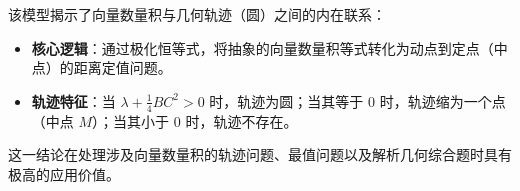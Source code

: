 \begin{explanationbox}
该模型揭示了向量数量积与几何轨迹（圆）之间的内在联系：
\begin{itemize}
    \item \textbf{核心逻辑}：通过极化恒等式，将抽象的向量数量积等式转化为动点到定点（中点）的距离定值问题。
    \item \textbf{轨迹特征}：当 $\lambda + \frac{1}{4}BC^2 > 0$ 时，轨迹为圆；当其等于 0 时，轨迹缩为一个点（中点 $M$）；当其小于 0 时，轨迹不存在。
\end{itemize}
这一结论在处理涉及向量数量积的轨迹问题、最值问题以及解析几何综合题时具有极高的应用价值。
\end{explanationbox}